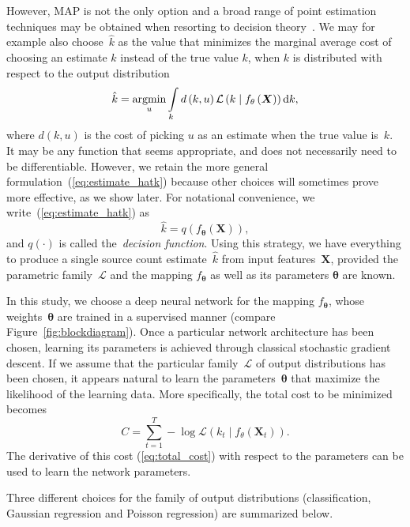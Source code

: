However, MAP is not the only option and a broad range of point estimation techniques may be obtained when resorting to decision theory~\cite{berger1985}.
We may for example also choose~$\hat{k}$ as the value that minimizes the marginal average cost of choosing an estimate $\hat{k}$ instead of the true value $k$, when $k$ is distributed with respect to the output distribution
\begin{equation}
\hat{k}=\underset{u}{\text{argmin}}\intop_{k}d\left(k,u\right)\mathcal{L}\left(k\mid f_{\mathbf{\theta}}\left(\boldsymbol{X}\right)\right) \mathrm{d} k,\label{eq:estimate_hatk}
\end{equation}
where $d\left(k,u\right)$ is the cost of picking $u$ as an estimate when the true value is~$k$.
It may be any function that seems appropriate, and does not necessarily need to be differentiable.
However, we retain the more general formulation~(\ref{eq:estimate_hatk}) because other choices will sometimes prove more effective, as we show later.
For notational convenience, we write~(\ref{eq:estimate_hatk}) as
\begin{equation}
\hat{k}=q\left(f_{\mathbf{\theta}}\left(\boldsymbol{X}\right)\right),
\end{equation}
and $q\left(\cdot\right)$ is called the~\textit{decision function}.
Using this strategy, we have everything to produce a single source count estimate~$\hat{k}$ from input features~$\mathbf{X}$, provided the parametric family~$\mathcal{L}$ and the mapping $f_{\mathbf{\theta}}$ as well as its parameters $\mathbf{\theta}$ are known.

In this study, we choose a deep neural network for the mapping $f_{\mathbf{\theta}}$, whose weights~$\mathbf{\theta}$ are trained in a supervised manner (compare Figure~\ref{fig:blockdiagram}).
Once a particular network architecture has been chosen, learning its parameters is achieved through classical stochastic gradient descent.
If we assume that the particular family~$\mathcal{L}$ of output distributions has been chosen, it appears natural to learn the parameters~$\mathbf{\theta}$ that maximize the likelihood of the learning data.
More specifically, the total cost to be minimized becomes
\begin{equation}
C=\sum_{t=1}^{T}-\log\mathcal{L}\left(k_{t}\mid f_{\theta}\left(\boldsymbol{X}_{t}\right)\right).\label{eq:total_cost}
\end{equation}
The derivative of this cost (\ref{eq:total_cost}) with respect to the parameters can be used to learn the network parameters.
\par
Three different choices for the family of output distributions (classification, Gaussian regression and Poisson regression) are summarized below.

